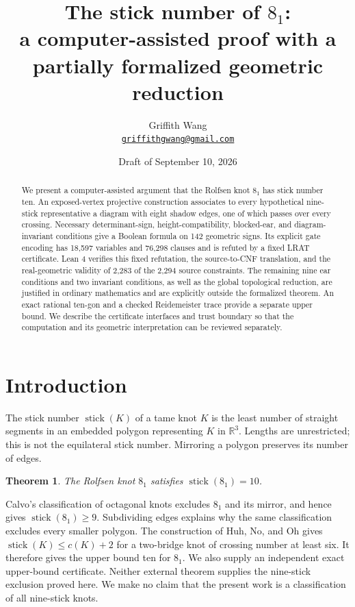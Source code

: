 \documentclass[11pt]{article}
\title{The stick number of $8_1$:\\a computer-assisted proof with a partially formalized geometric reduction}
\author{Griffith Wang\\[3pt]\small\href{mailto:griffithgwang@gmail.com}{\texttt{griffithgwang@gmail.com}}}
\date{Draft of September 10, 2026}
\newtheorem{theorem}{Theorem}[section]
\newcommand{\R}{\mathbb R}
\newcommand{\stick}{\operatorname{stick}}
\begin{document}
\maketitle
\begin{abstract}
We present a computer-assisted argument that the Rolfsen knot $8_1$ has
stick number ten. An exposed-vertex projective construction associates to
every hypothetical nine-stick representative a diagram with eight shadow
edges, one of which passes over every crossing. Necessary determinant-sign,
height-compatibility, blocked-ear, and diagram-invariant conditions give a
Boolean formula on 142 geometric signs. Its explicit gate encoding has
18,597 variables and 76,298 clauses and is refuted by a fixed LRAT
certificate. Lean 4 verifies this fixed refutation, the source-to-CNF
translation, and the real-geometric validity of 2,283 of the 2,294 source
constraints. The remaining nine ear conditions and two invariant conditions,
as well as the global topological reduction, are justified in ordinary
mathematics and are explicitly outside the formalized theorem. An exact
rational ten-gon and a checked Reidemeister trace provide a separate upper
bound. We describe the certificate interfaces and trust boundary so that
the computation and its geometric interpretation can be reviewed separately.
\end{abstract}

\section{Introduction}
The stick number $\stick(K)$ of a tame knot $K$ is the least number of
straight segments in an embedded polygon representing $K$ in $\R^3$.
Lengths are unrestricted; this is not the equilateral stick number.
Mirroring a polygon preserves its number of edges.

\begin{theorem}\label{thm:main}
The Rolfsen knot $8_1$ satisfies $\stick(8_1)=10$.
\end{theorem}

Calvo's classification of octagonal knots \cite[Theorem 1(iv)]{calvo}
excludes $8_1$ and its mirror, and hence gives $\stick(8_1)\geq9$.
Subdividing edges explains why the same classification excludes every
smaller polygon. The construction of Huh, No, and Oh
\cite[Theorem 1.1]{hno} gives $\stick(K)\leq c(K)+2$ for a two-bridge knot
of crossing number at least six. It therefore gives the upper bound ten
for $8_1$. We also supply an independent exact upper-bound certificate.
Neither external theorem supplies the nine-stick exclusion proved here.
We make no claim that the present work is a classification of all nine-stick knots.
\end{document}
